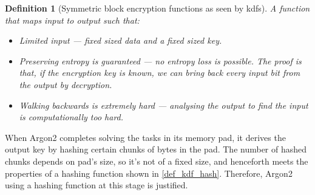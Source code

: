 \documentclass[twocolumn]{article}
\newtheorem{definition}{Definition}[section]
\begin{document}
\begin{definition}[Symmetric block encryption functions as seen by
\glspl{kdf}]\label{def_kdf_enc}
    A function that maps input to output such that:
    \begin{itemize}
        \item Limited input --- fixed sized data and a fixed sized
        key.

        \item Preserving entropy is guaranteed --- no entropy loss is
        possible.  The proof is that, if the encryption key is known, we
        can bring back every input bit from the output by decryption.

        \item Walking backwards is extremely hard --- analysing the output
        to find the input is computationally too hard.
    \end{itemize}
\end{definition}

When Argon2 completes solving the tasks in its memory pad, it
derives the output key by hashing certain chunks of bytes in the pad.  The
number of hashed chunks depends on pad's size, so it's not of a fixed size,
and henceforth meets the properties of a hashing function shown in
\cref{def_kdf_hash}.  Therefore, Argon2 using a hashing function at
this stage is justified.
\end{document}
